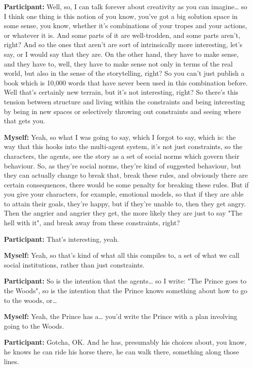\documentclass[11pt]{report}
\begin{document}
\begin{linenumbers}
\textbf{Participant:} Well, so, I can talk forever about creativity as you can imagine\ldots{} so I think one thing is this notion of you know, you've got a big solution space in some sense, you know, whether it's combinations of your tropes and your actions, or whatever it is. And some parts of it are well-trodden, and some parts aren't, right? And so the ones that aren't are sort of intrinsically more interesting, let's say, or I would say that they are. On the other hand, they have to make sense, and they have to, well, they have to make sense not only in terms of the real world, but also in the sense of the storytelling, right? So you can't just publish a book which is 10,000 words that have never been used in this combination before. Well that's certainly new terrain, but it's not interesting, right? So there's this tension between structure and living within the constraints and being interesting by being in new spaces or selectively throwing out constraints and seeing where that gets you.

\textbf{Myself:} Yeah, so what I was going to say, which I forgot to say, which is: the way that this hooks into the multi-agent system, it's not just constraints, so the characters, the agents, see the story as a set of social norms which govern their behaviour. So, as they're social norms, they're kind of suggested behaviour, but they can actually change to break that, break these rules, and obviously there are certain consequences, there would be some penalty for breaking these rules. But if you give your characters, for example, emotional models, so that if they are able to attain their goals, they're happy, but if they're unable to, then they get angry. Then the angrier and angrier they get, the more likely they are just to say "The hell with it", and break away from these constraints, right?

\textbf{Participant:} That's interesting, yeah.

\textbf{Myself:} Yeah, so that's kind of what all this compiles to, a set of what we call social institutions, rather than just constraints.

\textbf{Participant:} So is the intention that the agents\ldots{} so I write: "The Prince goes to the Woods", so is the intention that the Prince knows something about how to go to the woods, or\ldots{}

\textbf{Myself:} Yeah, the Prince has a\ldots{} you'd write the Prince with a plan involving going to the Woods.

\textbf{Participant:} Gotcha, OK. And he has, presumably his choices about, you know, he knows he can ride his horse there, he can walk there, something along those lines.


\end{linenumbers}
\end{document}
